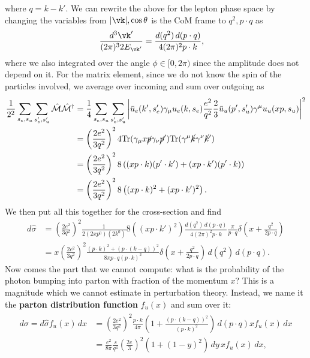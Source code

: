 \documentclass[a4paper, 11pt, normalem]{report}
\begin{document}
where $q=k-k'$.
We can rewrite the above for the lepton phase space by changing the variables from $|\vk|,\cos\theta$ is the CoM frame to $q^2,p\cdot q$ as
\begin{align}
    \frac{d^3\vk'}{(2\pi)^32E_{\vk'}} &= \frac{d(q^2)\,d(p\cdot q)}{4(2\pi)^2p\cdot k},
\end{align}
where we also integrated over the angle $\phi\in[0,2\pi)$ since the amplitude does not depend on it.
For the matrix element, since we do not know the spin of the particles involved, we average over incoming and sum over outgoing as
\begin{align}
    \frac{1}{2^2}\sum_{s_e,s_u}\sum_{s_e',s_u'} \hat{\mathcal{M}}\hat{\mathcal{M}}^\dagger &= \frac14 \sum_{s_e,s_u}\sum_{s_e',s_u'} \bigg|\bar{u}_e(k',s_e')\gamma_\mu u_e(k,s_e)\frac{e^2}{q^2}\frac23 \bar{u}_u(p',s_u')\gamma^\mu u_u(xp,s_u)\bigg|^2 \\
                                                                                           &= \left(\frac{2e^2}{3q^2}\right)^2 4\text{Tr}(\gamma_\mu x\cancel{p}\gamma_\nu \cancel{p}')\text{Tr}(\gamma^\mu\cancel{k}\gamma^\nu\cancel{k}') \\
                                                                                           &= \left(\frac{2e^2}{3q^2}\right)^28\left((xp\cdot k)(p'\cdot k')+(xp\cdot k')(p'\cdot k)\right) \\
                                                                                           &= \left(\frac{2e^2}{3q^2}\right)^28\left((xp\cdot k)^2+(xp\cdot k')^2\right).
\end{align}
We then put all this together for the cross-section and find
\begin{align}
    d\hat{\sigma} &= \left(\frac{2e^2}{3q^2}\right)^2\frac{1}{2(2xp^0)(2k^0)}8\left((xp\cdot k')^2\right) \frac{d(q^2)\,d(p\cdot q)}{4(2\pi)^2p\cdot k}\frac{\pi}{p\cdot q}\delta\left(x+\frac{q^2}{2p\cdot q}\right) \\
                  &= x\left(\frac{2e^2}{3q^2}\right)^2\frac{(p\cdot k)^2+(p\cdot(k-q))^2}{8\pi p\cdot q(p\cdot k)^2}\delta\left(x+\frac{q^2}{2p\cdot q}\right)\,d(q^2)\,d(p\cdot q).
\end{align}
Now comes the part that we cannot compute: what is the probability of the photon bumping into  parton with fraction of the momentum $x$?
This is a magnitude which we cannot estimate in perturbation theory.
Instead, we name it the \textbf{parton distribution function} $f_u(x)$ and sum over it:
\begin{align}
    \begin{split}
        d\sigma = d\hat{\sigma}f_u(x)\,dx &= \left(\frac{2e^2}{3q^2}\right)^2\frac{p\cdot k}{4\pi}\left(1+\frac{\left(p\cdot(k-q)\right)^2}{(p\cdot k)^2}\right)\,d(p\cdot q)xf_u(x)\,dx \\
                                          &= \frac{e^2}{8\pi}\frac{s}{q^4}\left(\frac{2e}{3}\right)^2\left(1+(1-y)^2\right)\,dy\,xf_u(x)\,dx,
    \end{split}
\end{align}
\end{document}
